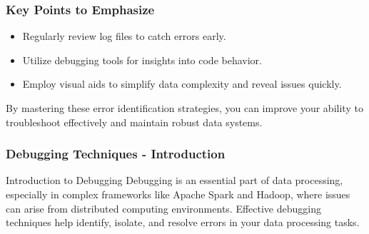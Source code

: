 \documentclass[aspectratio=169]{beamer}
\begin{document}
\begin{frame}
    \frametitle{Key Points to Emphasize}
    \begin{itemize}
        \item Regularly review log files to catch errors early.
        \item Utilize debugging tools for insights into code behavior.
        \item Employ visual aids to simplify data complexity and reveal issues quickly.
    \end{itemize}
    
    By mastering these error identification strategies, you can improve your ability to troubleshoot effectively and maintain robust data systems.
\end{frame}

\begin{frame}[fragile]
    \frametitle{Debugging Techniques - Introduction}

    \begin{block}{Introduction to Debugging}
        Debugging is an essential part of data processing, especially in complex frameworks like Apache Spark and Hadoop, where issues can arise from distributed computing environments. Effective debugging techniques help identify, isolate, and resolve errors in your data processing tasks.
    \end{block}
\end{frame}
\end{document}
